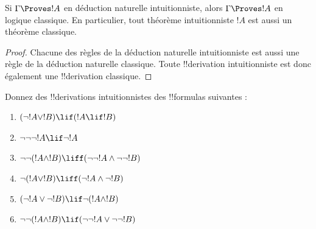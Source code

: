 \documentclass[../../../include/open-logic-section]{subfiles}
\begin{document}
\begin{prop}
  Si $\Gamma \Proves !A$ en déduction naturelle intuitionniste,
  alors $\Gamma \Proves !A$ en logique classique. En particulier,
  tout théorème intuitionniste $!A$ est aussi un théorème classique.
\end{prop}

\begin{proof}
  Chacune des règles de la déduction naturelle intuitionniste est
  aussi une règle de la déduction naturelle classique. Toute
  !!{derivation} intuitionniste est donc également une
  !!{derivation} classique.
\end{proof}

\begin{prob}
  Donnez des !!{derivation}s intuitionnistes des !!{formula}s suivantes :
  \begin{enumerate}
    \item $(\lnot !A \lor !B) \lif (!A \lif !B)$
    \item $\lnot\lnot\lnot !A \lif \lnot !A$
    \item $\lnot\lnot (!A \land !B) \liff (\lnot\lnot !A\land \lnot \lnot !B)$
    \item $\lnot (!A \lor !B) \liff (\lnot !A \land \lnot !B)$
    \item $(\lnot !A \lor \lnot !B) \lif \lnot (!A \land !B)$
    \item $\lnot\lnot ( !A \land !B) \lif  (\lnot\lnot !A \lor
    \lnot\lnot !B)$
  \end{enumerate}
\end{prob}
\end{document}
